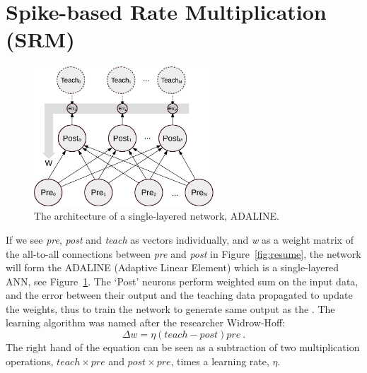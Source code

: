 \section{Spike-based Rate Multiplication (SRM)}
\label{sec:SRM}
\begin{figure}
	\centering
	\includegraphics[width=0.6\textwidth]{pics_sdlm/adaline.pdf}
	\caption{The architecture of a single-layered network, ADALINE.}
	\label{fig:adaline}
\end{figure}
If we see \textit{pre}, \textit{post} and \textit{teach} as vectors individually, and \textit{w} as a weight matrix of the all-to-all connections between \textit{pre} and \textit{post} in Figure~\ref{fig:resume}, the network will form the ADALINE (Adaptive Linear Element) which is a single-layered ANN, see Figure~\ref{fig:adaline}.
The `Post' neurons perform \DIFaddbegin {}\DIFaddend weighted sum on the input data, and the error between their output and the teaching data \DIFdelbegin {}\DIFdelend \DIFaddbegin {}\DIFaddend propagated to update the weights, thus to train the network to generate \DIFaddbegin {}\DIFaddend same output as the \DIFdelbegin {}\DIFdelend \DIFaddbegin {}\DIFaddend . 
The learning algorithm was named after the researcher Widrow-Hoff:
\begin{equation}
\Delta w = \eta (teach - post)pre~.
\label{equ:widrow-hoff}
\end{equation}
The right hand \DIFaddbegin {}\DIFaddend of the equation can be seen as a subtraction of two multiplication operations, $teach \times pre$ and $post \times pre$, times a learning rate, $\eta$.

